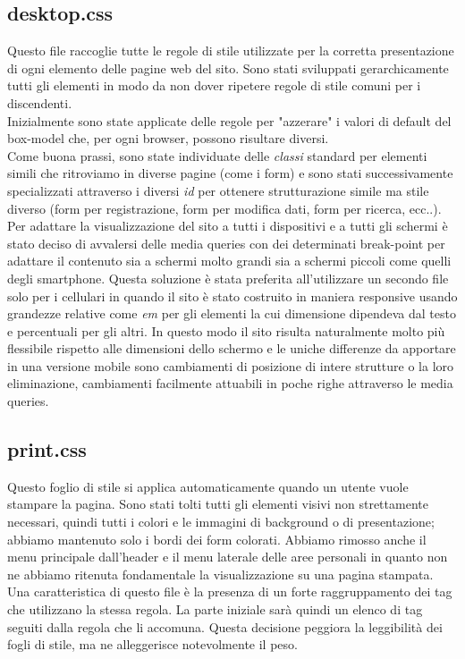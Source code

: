 	\subsection{desktop.css}
	Questo file raccoglie tutte le regole di stile utilizzate per la corretta presentazione di ogni elemento delle pagine web del sito. Sono stati sviluppati gerarchicamente tutti gli elementi in modo da non dover ripetere regole di stile comuni per i discendenti. \\
	Inizialmente sono state applicate delle regole per "azzerare" i valori di default del box-model che, per ogni browser, possono risultare diversi.\\
	Come buona prassi, sono state individuate delle \emph{classi} standard per elementi simili che ritroviamo in diverse pagine (come i form) e sono stati successivamente specializzati attraverso i diversi \emph{id} per ottenere strutturazione simile ma stile diverso (form per registrazione, form per modifica dati, form per ricerca, ecc..).\\
	Per adattare la visualizzazione del sito a tutti i dispositivi e a tutti gli schermi è stato deciso di avvalersi delle media queries con dei determinati break-point per adattare il contenuto sia a schermi molto grandi sia a schermi piccoli come quelli degli smartphone. Questa soluzione è stata preferita all'utilizzare un secondo file solo per i cellulari in quando il sito è stato costruito in maniera responsive usando grandezze relative come \emph{em} per gli elementi la cui dimensione dipendeva dal testo e percentuali per gli altri. In questo modo il sito risulta naturalmente molto più flessibile rispetto alle dimensioni dello schermo e le uniche differenze da apportare in una versione mobile sono cambiamenti di posizione di intere strutture o la loro eliminazione, cambiamenti facilmente attuabili in poche righe attraverso le media queries.
	
	\subsection{print.css}
	Questo foglio di stile si applica automaticamente quando un utente vuole
stampare la pagina. Sono stati tolti tutti gli elementi visivi non strettamente necessari, quindi tutti i colori e le immagini di background o di presentazione; abbiamo mantenuto solo i bordi dei form colorati. Abbiamo rimosso anche il menu principale dall'header e il menu laterale delle aree personali in quanto non ne abbiamo ritenuta fondamentale la visualizzazione su una pagina stampata. Una caratteristica di questo file è la presenza di un forte raggruppamento dei tag che utilizzano la stessa regola. La parte iniziale sarà quindi un elenco di tag seguiti dalla regola che li accomuna. Questa decisione peggiora la leggibilità dei fogli di stile, ma ne alleggerisce notevolmente il peso.




